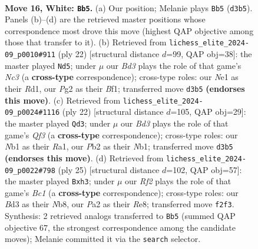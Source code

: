 \documentclass[11pt]{article}
\begin{document}
\clearpage

\begin{figure}[p]\centering
\begin{subfigure}{0.46\textwidth}\centering
\resizebox{\linewidth}{!}{%
\newchessgame
\chessboard[
  setfen={r1b3k1/p3rppp/4pn2/2pq4/n7/3BP1P1/PP3RPP/RNQ1N1K1 w - - 0 16},
  showmover=false,
  pgfstyle=straightmove, color=movearrow, markmove={d3-b5}
]}
\caption{}
\end{subfigure}\hfill
\begin{subfigure}{0.46\textwidth}\centering
\resizebox{\linewidth}{!}{%
\newchessgame
\chessboard[
  setfen={r1b1k1nr/pp2pp1p/2n3p1/4P3/3N3Q/2N5/PqP2PPP/3RKB1R w Kkq - 0 12},
  showmover=false,
  pgfstyle=straightmove, color=movearrow, markmove={c3-d5}
]}
\caption{}
\end{subfigure}
\\[4pt]
\begin{subfigure}{0.46\textwidth}\centering
\resizebox{\linewidth}{!}{%
\newchessgame
\chessboard[
  setfen={r3kb1r/pp2pppp/5n2/q2p2B1/3n4/1B3Q1P/PP3PP1/RN3RK1 w kq - 0 12},
  showmover=false,
  pgfstyle=straightmove, color=movearrow, markmove={f3-d3}
]}
\caption{}
\end{subfigure}\hfill
\begin{subfigure}{0.46\textwidth}\centering
\resizebox{\linewidth}{!}{%
\newchessgame
\chessboard[
  setfen={rnb1r1k1/pp3ppp/2q2n2/8/4pQ2/2N3PN/PP2PPBP/R3K2R b KQ - 7 13},
  showmover=false,
  pgfstyle=straightmove, color=movearrow, markmove={c8-h3}
]}
\caption{}
\end{subfigure}
\caption{\textbf{Move 16, White: \texttt{Bb5}.} (a) Our position; Melanie plays \texttt{Bb5} (\texttt{d3b5}). Panels (b)--(d) are the retrieved master positions whose correspondence most drove this move (highest QAP objective among those that transfer to it). (b) Retrieved from \texttt{lichess\_elite\_2024-09\_p0010\#911} (ply 22) [structural distance $d$=99, QAP obj=38]: the master played \texttt{Nd5}; under $\mu$ our \emph{Bd3} plays the role of that game's \emph{Nc3} (a \textbf{cross-type} correspondence); cross-type roles: our \emph{N}e1 as their \emph{R}d1, our \emph{P}g2 as their \emph{B}f1; transferred move \texttt{d3b5} \textbf{(endorses this move)}. (c) Retrieved from \texttt{lichess\_elite\_2024-09\_p0024\#1116} (ply 22) [structural distance $d$=105, QAP obj=29]: the master played \texttt{Qd3}; under $\mu$ our \emph{Bd3} plays the role of that game's \emph{Qf3} (a \textbf{cross-type} correspondence); cross-type roles: our \emph{N}b1 as their \emph{R}a1, our \emph{P}b2 as their \emph{N}b1; transferred move \texttt{d3b5} \textbf{(endorses this move)}. (d) Retrieved from \texttt{lichess\_elite\_2024-09\_p0022\#798} (ply 25) [structural distance $d$=102, QAP obj=57]: the master played \texttt{Bxh3}; under $\mu$ our \emph{Rf2} plays the role of that game's \emph{Bc1} (a \textbf{cross-type} correspondence); cross-type roles: our \emph{B}d3 as their \emph{N}b8, our \emph{P}a2 as their \emph{R}e8; transferred move \texttt{f2f3}. Synthesis: 2 retrieved analogs transferred to \texttt{Bb5} (summed QAP objective 67, the strongest correspondence among the candidate moves); Melanie committed it via the \texttt{search} selector.}
\label{fig:thought-m30}
\end{figure}
\end{document}
